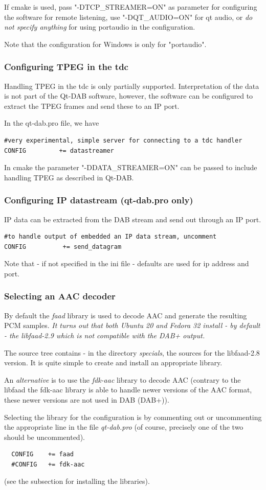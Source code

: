 \documentclass[12pt]{article}
\begin{document}
If cmake is used, pass "-DTCP\_STREAMER=ON" as parameter for
configuring the software for remote listening,
use "-DQT\_AUDIO=ON" for qt audio, or {\em do not specify anything} for
using portaudio in the configuration.
\par
Note that the configuration for Windows is only for "portaudio".
\subsubsection{Configuring TPEG in the tdc}
Handling TPEG in the tdc is only partially supported. Interpretation of the
data is not part of the Qt-DAB software, however, the software can
be configured to extract the TPEG frames and send these to an IP port.
\par
In the qt-dab.pro file, we have
\begin{verbatim}
#very experimental, simple server for connecting to a tdc handler
CONFIG         += datastreamer
\end{verbatim}
\par
In cmake the parameter "-DDATA\_STREAMER=ON"
can be passed to include handling TPEG  as described in Qt-DAB.

\subsubsection{Configuring IP datastream (qt-dab.pro only)}
IP data can be extracted from the DAB stream and send out through
an IP port.

\begin{verbatim}
#to handle output of embedded an IP data stream, uncomment
CONFIG          += send_datagram
\end{verbatim}

Note that - if not specified in the ini file - defaults are used for
ip address and port.
\subsubsection{Selecting an AAC decoder}
By default the {\em faad} library is used to decode AAC and generate the
resulting PCM samples.
{\em It turns out that both Ubuntu 20 and Fedora 32 install - by default - 
the libfaad-2.9 which is not compatible with the DAB+ output.}
\par
The source tree contains - in the directory {\em specials}, the sources
for the libfaad-2.8 version. It is quite simple to create and install
an appropriate library.
\par
An {\em alternative} is to use the {\em fdk-aac} library to decode AAC
(contrary to the libfaad the fdk-aac library is able to handle newer
versions of the AAC format, these newer versions are not used in DAB (DAB+)).
\par
Selecting the library for the configuration is by commenting
out or uncommenting the appropriate line in the file
{\em qt-dab.pro} (of course, precisely one of the two should be uncommented).
\begin{verbatim}
  CONFIG    += faad
  #CONFIG   += fdk-aac
\end{verbatim}
(see the subsection for installing the libraries).
\end{document}
